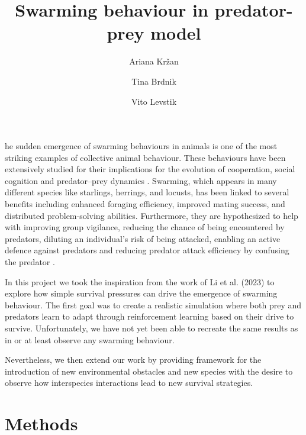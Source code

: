 \documentclass[9pt]{pnas-new}
\title{Swarming behaviour in predator-prey model}
\author{Ariana Kržan}
\author{Tina Brdnik}
\author{Vito Levstik}
\affil{Collective behaviour course research seminar report}
\begin{document}
\verticaladjustment{-2pt}

\maketitle
\thispagestyle{firststyle}

he sudden emergence of swarming behaviours in animals is one of the most striking examples of collective animal behaviour. 
These behaviours have been extensively studied for their implications for the evolution of cooperation, 
social cognition and predator–prey dynamics \cite{olson2013predator}. Swarming, which appears in many different species like starlings, 
herrings, and locusts, has been linked to several benefits including enhanced foraging efficiency, improved mating success, and distributed problem-solving abilities. 
Furthermore, they are hypothesized to help with improving group vigilance, reducing the chance of being encountered by predators, 
diluting an individual's risk of being attacked, enabling an active defence against predators and reducing predator attack efficiency by confusing the predator \cite{li2023predator}.

In this project we took the inspiration from the work of Li et al. (2023) \cite{li2023predator} to explore how simple survival pressures can drive the emergence of swarming behaviour. 
The first goal was to create a realistic simulation where both prey and predators learn to adapt through reinforcement learning based on their drive to survive.
Unfortunately, we have not yet been able to recreate the same results as in \cite{li2023predator} or at least observe any swarming behaviour.

Nevertheless, we then extend our work by providing framework for the introduction of new environmental obstacles and new species with the desire to observe how interspecies interactions lead to new survival strategies.

\section*{Methods}
\end{document}
